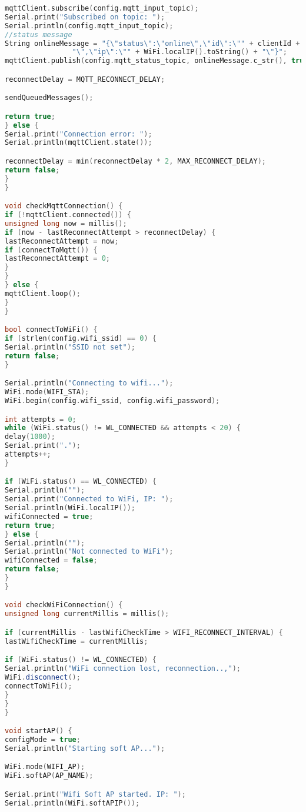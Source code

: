 \begin{lstlisting}[language=C++]
mqttClient.subscribe(config.mqtt_input_topic);
Serial.print("Subscribed on topic: ");
Serial.println(config.mqtt_input_topic);
//status message
String onlineMessage = "{\"status\":\"online\",\"id\":\"" + clientId + 
                "\",\"ip\":\"" + WiFi.localIP().toString() + "\"}";
mqttClient.publish(config.mqtt_status_topic, onlineMessage.c_str(), true);

reconnectDelay = MQTT_RECONNECT_DELAY;

sendQueuedMessages();

return true;
} else {
Serial.print("Connection error: ");
Serial.println(mqttClient.state());

reconnectDelay = min(reconnectDelay * 2, MAX_RECONNECT_DELAY);
return false;
}
}

void checkMqttConnection() {
if (!mqttClient.connected()) {
unsigned long now = millis();
if (now - lastReconnectAttempt > reconnectDelay) {
lastReconnectAttempt = now;
if (connectToMqtt()) {
lastReconnectAttempt = 0;
}
}
} else {
mqttClient.loop();
}
}

bool connectToWiFi() {
if (strlen(config.wifi_ssid) == 0) {
Serial.println("SSID not set");
return false;
}

Serial.println("Connecting to wifi...");
WiFi.mode(WIFI_STA);
WiFi.begin(config.wifi_ssid, config.wifi_password);

int attempts = 0;
while (WiFi.status() != WL_CONNECTED && attempts < 20) {
delay(1000);
Serial.print(".");
attempts++;
}

if (WiFi.status() == WL_CONNECTED) {
Serial.println("");
Serial.print("Connected to WiFi, IP: ");
Serial.println(WiFi.localIP());
wifiConnected = true;
return true;
} else {
Serial.println("");
Serial.println("Not connected to WiFi");
wifiConnected = false;
return false;
}
}

void checkWiFiConnection() {
unsigned long currentMillis = millis();

if (currentMillis - lastWifiCheckTime > WIFI_RECONNECT_INTERVAL) {
lastWifiCheckTime = currentMillis;

if (WiFi.status() != WL_CONNECTED) {
Serial.println("WiFi connection lost, reconnection..,");
WiFi.disconnect();
connectToWiFi();
}
}
}

void startAP() {
configMode = true;
Serial.println("Starting soft AP...");

WiFi.mode(WIFI_AP);
WiFi.softAP(AP_NAME);

Serial.print("Wifi Soft AP started. IP: ");
Serial.println(WiFi.softAPIP());


\end{lstlisting}
